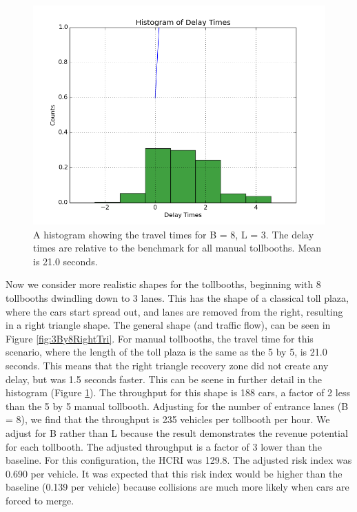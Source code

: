 \documentclass[a4paper, 11pt]{article}
\begin{document}
\begin{figure}
\begin{center}
\includegraphics[scale=0.5]{Images/hist_3_8.png}
\caption{A histogram showing the travel times for B = 8, L = 3. The delay times are relative to the benchmark for all manual tollbooths. Mean is 21.0 seconds.}
\label{fig:manual38}
\end{center}
\end{figure}


Now we consider more realistic shapes for the tollbooths, beginning with 8 tollbooths dwindling down to 3 lanes. 
This has the shape of a classical toll plaza, where the cars start spread out, and lanes are removed from the right, resulting in a right triangle shape. 
The general shape (and traffic flow), can be seen in Figure \ref{fig:3By8RightTri}. For manual tollbooths, the travel time for this scenario, where the length of the toll plaza is the same as the 5 by 5, is 21.0 seconds. This means that the right triangle recovery zone did not create any delay, but was 1.5 seconds faster. 
This can be scene in further detail in the histogram (Figure \ref{fig:manual38}). The throughput for this shape is 188 cars, a factor of 2 less than the 5 by 5 manual tollbooth. Adjusting for the number of entrance lanes (B = 8), we find that the throughput is 235 vehicles per tollbooth per hour. We adjust for B rather than L because the result demonstrates the revenue potential for each tollbooth. The adjusted throughput is a factor of 3 lower than the baseline. For this configuration, the HCRI was 129.8. The adjusted risk index was 0.690 per vehicle. It was expected that this risk index would be higher than the baseline (0.139 per vehicle) because collisions are much more likely when cars are forced to merge. 
\end{document}
